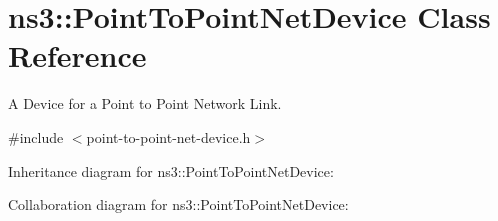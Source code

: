 \hypertarget{classns3_1_1PointToPointNetDevice}{}\section{ns3\+:\+:Point\+To\+Point\+Net\+Device Class Reference}
\label{classns3_1_1PointToPointNetDevice}


A Device for a Point to Point Network Link.  




{\ttfamily \#include $<$point-\/to-\/point-\/net-\/device.\+h$>$}



Inheritance diagram for ns3\+:\+:Point\+To\+Point\+Net\+Device\+:


Collaboration diagram for ns3\+:\+:Point\+To\+Point\+Net\+Device\+:
